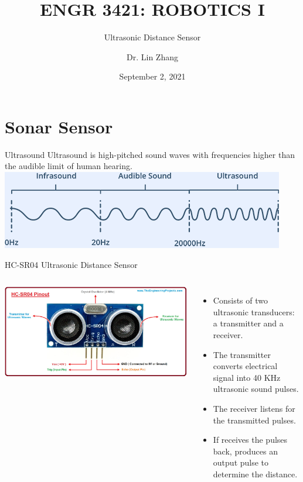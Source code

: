 \documentclass[12pt,letterpaper]{beamer}
\title[Robotics I]
{ENGR 3421: ROBOTICS I}
\subtitle{Ultrasonic Distance Sensor}
\author[Zhang, Lin]
{Dr. Lin Zhang}
\institute[UCA] %
{
  Department of Physics and Astronomy\\
  University of Central Arkansas
}
\date[Robotics1 2021] %
{September 2, 2021}
\begin{document}
\frame{\titlepage}


\section{Sonar Sensor}

\begin{frame}{Ultrasound}
    Ultrasound is high-pitched sound waves with frequencies higher than the audible limit of human hearing.
    {\centering
        \includegraphics[width=0.8\linewidth]{ultrasound_frequency}
    }
\end{frame}

\begin{frame}{HC-SR04 Ultrasonic Distance Sensor}
    \begin{columns}
        \includegraphics[width=1.1\linewidth]{HC-SR04}

        {\scriptsize
            \begin{itemize} 
                \item Consists of two ultrasonic transducers: a transmitter and a receiver. 
                \item The transmitter converts electrical signal into 40 KHz ultrasonic sound pulses. 
                \item The receiver listens for the transmitted pulses. 
                \item If receives the pulses back, produces an output pulse to determine the distance. 
            \end{itemize} 
        }
    \end{columns}
\end{frame}
\end{document}
